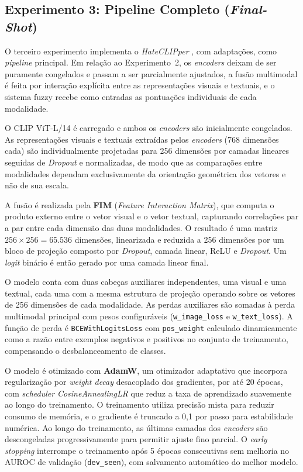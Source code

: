 \subsection{Experimento 3: Pipeline Completo (\textit{Final-Shot})}

O terceiro experimento implementa o \textit{HateCLIPper} \cite{kumar2022}, com adaptações, como \textit{pipeline} principal. Em relação ao Experimento~2, os \textit{encoders} deixam de ser puramente congelados e passam a ser parcialmente ajustados, a fusão multimodal é feita por interação explícita entre as representações visuais e textuais, e o sistema fuzzy recebe como entradas as pontuações individuais de cada modalidade.

O CLIP ViT-L/14 é carregado e ambos os \textit{encoders} são inicialmente congelados. As representações visuais e textuais extraídas pelos \textit{encoders} (768 dimensões cada) são individualmente projetadas para 256 dimensões por camadas lineares seguidas de \textit{Dropout} e normalizadas, de modo que as comparações entre modalidades dependam exclusivamente da orientação geométrica dos vetores e não de sua escala.

A fusão é realizada pela \textbf{FIM} (\textit{Feature Interaction Matrix}), que computa o produto externo entre o vetor visual e o vetor textual, capturando correlações par a par entre cada dimensão das duas modalidades. O resultado é uma matriz $256 \times 256 = 65.536$ dimensões, linearizada e reduzida a 256 dimensões por um bloco de projeção composto por \textit{Dropout}, camada linear, ReLU e \textit{Dropout}. Um \textit{logit} binário é então gerado por uma camada linear final.

O modelo conta com duas cabeças auxiliares independentes, uma visual e uma textual, cada uma com a mesma estrutura de projeção operando sobre os vetores de 256 dimensões de cada modalidade. As perdas auxiliares são somadas à perda multimodal principal com pesos configuráveis (\texttt{w\_image\_loss} e \texttt{w\_text\_loss}). A função de perda é \texttt{BCEWithLogitsLoss} com \texttt{pos\_weight} calculado dinamicamente como a razão entre exemplos negativos e positivos no conjunto de treinamento, compensando o desbalanceamento de classes.

O modelo é otimizado com \textbf{AdamW}, um otimizador adaptativo que incorpora regularização por \textit{weight decay} desacoplado dos gradientes, por até 20 épocas, com \textit{scheduler} \textit{CosineAnnealingLR} que reduz a taxa de aprendizado suavemente ao longo do treinamento. O treinamento utiliza precisão mista para reduzir consumo de memória, e o gradiente é truncado a 0,1 por passo para estabilidade numérica. Ao longo do treinamento, as últimas camadas dos \textit{encoders} são descongeladas progressivamente para permitir ajuste fino parcial. O \textit{early stopping} interrompe o treinamento após 5 épocas consecutivas sem melhoria no AUROC de validação (\texttt{dev\_seen}), com salvamento automático do melhor modelo.

